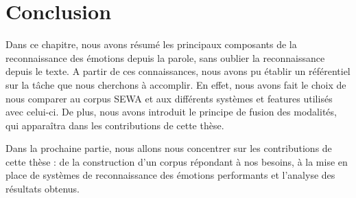 %
%
%

%
% 
%

\section{Conclusion}
Dans ce chapitre, nous avons résumé les principaux composants de la reconnaissance des émotions depuis la parole, sans oublier la reconnaissance depuis le texte. A partir de ces connaissances, nous avons pu établir un référentiel sur la tâche que nous cherchons à accomplir. En effet, nous avons fait le choix de nous comparer au corpus SEWA et aux différents systèmes et features utilisés avec celui-ci. De plus, nous avons introduit le principe de fusion des modalités, qui apparaîtra dans les contributions de cette thèse.

Dans la prochaine partie, nous allons nous concentrer sur les contributions de cette thèse : de la construction d'un corpus répondant à nos besoins, à la mise en place de systèmes de reconnaissance des émotions performants et l'analyse des résultats obtenus.
